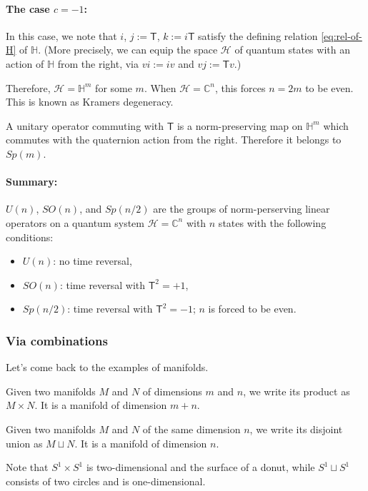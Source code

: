 \documentclass[12pt]{article}
\numberwithin{equation}{section}
\def\bC{\mathbb{C}}
\def\bH{\mathbb{H}}
\def\cH{\mathcal{H}}
\def\sT{\mathsf{T}}
\begin{document}
\paragraph{The case $c=-1$:}
In this case, we note that $i$, $j:=\sT$, $k:=i \sT$ satisfy 
the defining relation \eqref{eq:rel-of-H} of $\bH$.
(More precisely, we can equip the space $\cH$ of quantum states
with an action of $\bH$ from the right, via $vi := iv$ and $vj:=\sT v$.)

Therefore, $\cH= \bH^m$ for some $m$. When $\cH=\bC^n$, this forces $n=2m$ to be even.
This is known as Kramers degeneracy.

A unitary operator commuting with $\sT$
is a norm-preserving map on $\bH^m$ which commutes with the quaternion action from the right.
Therefore it belongs to $Sp(m)$.

\paragraph{Summary:}
$U(n)$, $SO(n)$, and $Sp(n/2)$ are the groups of norm-perserving linear operators
on a quantum system $\cH=\bC^n$ with $n$ states with the following conditions:
\begin{itemize}
\item $U(n)$: no time reversal,
\item $SO(n)$: time reversal with $\sT^2=+1$,
\item $Sp(n/2)$: time reversal with $\sT^2=-1$; $n$ is forced to be even.
\end{itemize}


\subsubsection{Via combinations}

Let's come back to the examples of manifolds.

\begin{notation}
 Given two manifolds $M$ and $N$ of dimensions $m$ and $n$,
 we write its product as $M\times N$.
It is a manifold of dimension $m+n$.
\end{notation}

\begin{notation}
Given two manifolds $M$ and $N$ of the same dimension $n$,
we write its disjoint union as $M\sqcup N$.
It is a manifold of dimension $n$.
\end{notation}

Note that $S^1\times S^1$ is two-dimensional and the surface of a donut,
while $S^1\sqcup S^1$ consists of two circles and is one-dimensional.
\end{document}

